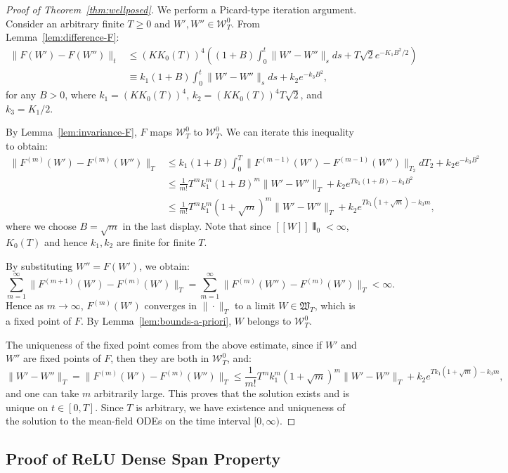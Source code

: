 \documentclass[11pt]{article}
\newcommand{\1}{\mathbbm{1}}
\newcommand{\llbracket}{[\![}
\newcommand{\rrbracket}{]\!]}
\newcommand{\interleave}[1]{\llbracket #1 \rrbracket}
\begin{document}
\begin{proof}[Proof of Theorem~\ref{thm:wellposed}]
We perform a Picard-type iteration argument. Consider an arbitrary finite $T\ge 0$ and $W',W''\in\mathcal{W}_T^0$. From Lemma~\ref{lem:difference-F}:
\begin{align*}
\|F(W')-F(W'')\|_t &\le (KK_0(T))^4\left((1+B)\int_0^t \|W'-W''\|_s ds + T\sqrt{2}e^{-K_1 B^2/2}\right)\\
&\equiv k_1(1+B)\int_0^t \|W'-W''\|_s ds + k_2 e^{-k_3 B^2},
\end{align*}
for any $B>0$, where $k_1=(KK_0(T))^4$, $k_2=(KK_0(T))^4 T\sqrt{2}$, and $k_3=K_1/2$.

By Lemma~\ref{lem:invariance-F}, $F$ maps $\mathcal{W}_T^0$ to $\mathcal{W}_T^0$. We can iterate this inequality to obtain:
\begin{align*}
\|F^{(m)}(W')-F^{(m)}(W'')\|_T &\le k_1(1+B)\int_0^T \|F^{(m-1)}(W')-F^{(m-1)}(W'')\|_{T_2} dT_2 + k_2 e^{-k_3 B^2}\\
&\le \frac{1}{m!} T^m k_1^m (1+B)^m \|W'-W''\|_T + k_2 e^{T k_1(1+B) - k_3 B^2}\\
&\le \frac{1}{m!} T^m k_1^m (1+\sqrt{m})^m \|W'-W''\|_T + k_2 e^{T k_1(1+\sqrt{m}) - k_3 m},
\end{align*}
where we choose $B=\sqrt{m}$ in the last display. Note that since $\interleave W\interleave_0<\infty$, $K_0(T)$ and hence $k_1, k_2$ are finite for finite $T$.

By substituting $W''=F(W')$, we obtain:
\[
\sum_{m=1}^\infty \|F^{(m+1)}(W')-F^{(m)}(W')\|_T = \sum_{m=1}^\infty \|F^{(m)}(W'')-F^{(m)}(W')\|_T < \infty.
\]
Hence as $m\to\infty$, $F^{(m)}(W')$ converges in $\|\cdot\|_T$ to a limit $W\in\mathfrak{W}_T$, which is a fixed point of $F$. By Lemma~\ref{lem:bounds-a-priori}, $W$ belongs to $\mathcal{W}_T^0$.

The uniqueness of the fixed point comes from the above estimate, since if $W'$ and $W''$ are fixed points of $F$, then they are both in $\mathcal{W}_T^0$, and:
\[
\|W'-W''\|_T = \|F^{(m)}(W')-F^{(m)}(W'')\|_T \le \frac{1}{m!} T^m k_1^m (1+\sqrt{m})^m \|W'-W''\|_T + k_2 e^{T k_1(1+\sqrt{m}) - k_3 m},
\]
and one can take $m$ arbitrarily large. This proves that the solution exists and is unique on $t\in[0,T]$. Since $T$ is arbitrary, we have existence and uniqueness of the solution to the mean-field ODEs on the time interval $[0,\infty)$.
\end{proof}

\subsection{Proof of ReLU Dense Span Property}
\label{app:relu-dense-span-proof}
\end{document}

